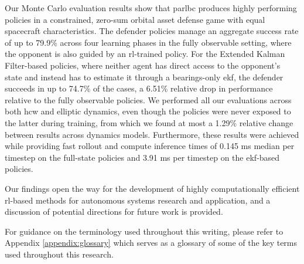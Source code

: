 Our Monte Carlo evaluation results show that \acs{parlbc} produces highly performing policies in a constrained, zero-sum orbital asset defense game with equal spacecraft characteristics. The defender policies manage an aggregate success rate of up to 79.9\% across four learning phases in the fully observable setting, where the opponent is also guided by an \acs{rl}-trained policy. For the Extended Kalman Filter-based policies, where neither agent has direct access to the opponent's state and instead has to estimate it through a bearings-only \acs{ekf}, the defender succeeds in up to 74.7\% of the cases, a 6.51\% relative drop in performance relative to the fully observable policies. We performed all our evaluations across both \acs{hcw} and elliptic dynamics, even though the policies were never exposed to the latter during training, from which we found at most a 1.29\% relative change between results across dynamics models. Furthermore, these results were achieved while providing fast rollout and compute inference times of 0.145 ms median per timestep on the full-state policies and 3.91 ms per timestep on the \acs{ekf}-based policies.

Our findings open the way for the development of highly computationally efficient \acs{rl}-based methods for autonomous systems research and application, and a discussion of potential directions for future work is provided.

For guidance on the terminology used throughout this writing, please refer to Appendix \ref{appendix:glossary} which serves as a glossary of some of the key terms used throughout this research.
